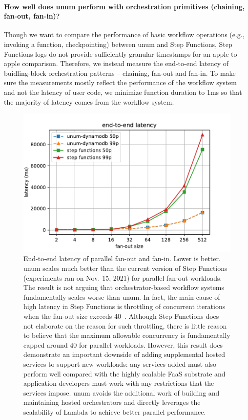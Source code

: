 \paragraph{How well does unum perform with orchestration primitives (chaining,
fan-out, fan-in)?}


Though we want to compare the performance of basic workflow operations (e.g.,
invoking a function, checkpointing) between unum and Step Functions, Step
Functions logs do not provide sufficiently granular timestamps for an
apple-to-apple comparison. Therefore, we instead measure the end-to-end
latency of buidling-block orchestration patterns -- chaining, fan-out and
fan-in. To make sure the measurements mostly reflect the performance of the
workflow system and not the latency of user code, we minimize function
duration to 1ms so that the majority of latency comes from the workflow
system.


\begin{figure}[t!]
    \centering
    \includegraphics[width=\columnwidth]{figures/MapMicroLatency.pdf}
    \caption{End-to-end latency of parallel fan-out and fan-in. Lower is
    better. unum scales much better than the current version of Step Functions
    (experiments ran on Nov. 15, 2021) for parallel fan-out workloads. The
    result is not arguing that orchestrator-based workflow systems
    fundamentally scales worse than unum. In fact, the main cause of high
    latency in Step Functions is throttling of concurrent iterations when the
    fan-out size exceeds 40~\cite{aws-step-functions-map-state}. Although Step
    Functions does not elaborate on the reason for such throttling, there is
    little reason to believe that the maximum allowable concurrency is
    fundamentally capped around 40 for parallel workloads. However, this
    result does demonstrate an important downside of adding supplemental
    hosted services to support new workloads: any services added must also
    perform well compared with the highly scalable FaaS substrate and
    application developers must work with any restrictions that the services
    impose. unum avoids the additional work of building and maintaining hosted
    orchestrators and directly leverages the scalability of Lambda to achieve
    better parallel performance.}
    \label{fig:mapmicrolatency}
\end{figure}


